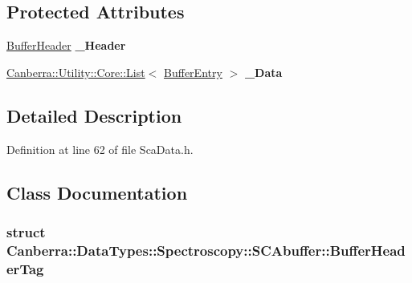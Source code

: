 \subsection*{Protected Attributes}
\begin{DoxyCompactItemize}
\item 
\mbox{\label{class_canberra_1_1_data_types_1_1_spectroscopy_1_1_s_c_abuffer_a43b5b6db79e441ff05f885686ea35dde}} 
\hyperlink{class_canberra_1_1_data_types_1_1_spectroscopy_1_1_s_c_abuffer_df/d28/struct_canberra_1_1_data_types_1_1_spectroscopy_1_1_s_c_abuffer_1_1_buffer_header_tag}{Buffer\+Header} {\bfseries \+\_\+\+Header}
\item 
\mbox{\label{class_canberra_1_1_data_types_1_1_spectroscopy_1_1_s_c_abuffer_a93062afb05db7e01c36c6ba81f83dbdb}} 
\hyperlink{class_canberra_1_1_utility_1_1_core_1_1_list}{Canberra\+::\+Utility\+::\+Core\+::\+List}$<$ \hyperlink{class_canberra_1_1_data_types_1_1_spectroscopy_1_1_s_c_abuffer_1_1_buffer_entry}{Buffer\+Entry} $>$ {\bfseries \+\_\+\+Data}
\end{DoxyCompactItemize}


\subsection{Detailed Description}


Definition at line 62 of file Sca\+Data.\+h.



\subsection{Class Documentation}
\label{struct_canberra_1_1_data_types_1_1_spectroscopy_1_1_s_c_abuffer_1_1_buffer_header_tag}
\subsubsection{struct Canberra\+:\+:Data\+Types\+:\+:Spectroscopy\+:\+:S\+C\+Abuffer\+:\+:Buffer\+Header\+Tag}


